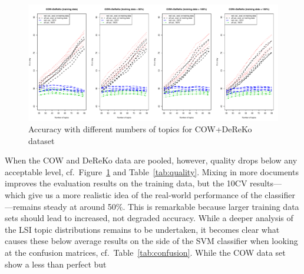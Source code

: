 \documentclass[11pt]{article}
\begin{document}
\begin{figure}[ht]
  \centering
  \includegraphics[width=\textwidth]{graphics/coreko.pdf}
  \caption{Accuracy with different numbers of topics for COW+DeReKo dataset}
  \label{fig:coreko}
\end{figure}

When the COW and DeReKo data are pooled, however, quality drops below any acceptable level, cf.\ Figure~\ref{fig:coreko} and Table~\ref{tab:quality}.
Mixing in more documents improves the evaluation results on the training data, but the 10CV results---which give us a more realistic idea of the real-world performance of the classifier---remains steady at around 50\%.
This is remarkable because larger training data sets should lead to increased, not degraded accuracy.
While a deeper analysis of the LSI topic distributions remains to be undertaken, it becomes clear what causes these below average results on the side of the SVM classifier when looking at the confusion matrices, cf.\ Table~\ref{tab:confusion}.
While the COW data set show a less than perfect but 
\end{document}
